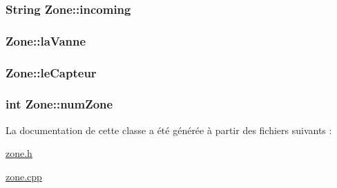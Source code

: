 \subsubsection[{\texorpdfstring{incoming}{incoming}}]{\setlength{\rightskip}{0pt plus 5cm}String Zone\+::incoming\hspace{0.3cm}{\ttfamily [private]}}\hypertarget{class_zone_ac4e36c704602ec1d06d90a1f2c62b8be}{}\label{class_zone_ac4e36c704602ec1d06d90a1f2c62b8be}
\subsubsection[{\texorpdfstring{la\+Vanne}{laVanne}}]{ Zone\+::la\+Vanne\hspace{0.3cm}{\ttfamily [private]}}\hypertarget{class_zone_a375ebd280cc5bd60ba3e76a36224bc44}{}\label{class_zone_a375ebd280cc5bd60ba3e76a36224bc44}
\subsubsection[{\texorpdfstring{le\+Capteur}{leCapteur}}]{ Zone\+::le\+Capteur\hspace{0.3cm}{\ttfamily [private]}}\hypertarget{class_zone_a1f070429b7b55eb43aed46664f64f469}{}\label{class_zone_a1f070429b7b55eb43aed46664f64f469}
\subsubsection[{\texorpdfstring{num\+Zone}{numZone}}]{\setlength{\rightskip}{0pt plus 5cm}int Zone\+::num\+Zone\hspace{0.3cm}{\ttfamily [private]}}\hypertarget{class_zone_a0efa38f2d12ae4d9ffcbffdee9b4f438}{}\label{class_zone_a0efa38f2d12ae4d9ffcbffdee9b4f438}


La documentation de cette classe a été générée à partir des fichiers suivants \+:\begin{DoxyCompactItemize}
\item 
\hyperlink{zone_8h}{zone.\+h}\item 
\hyperlink{zone_8cpp}{zone.\+cpp}\end{DoxyCompactItemize}
